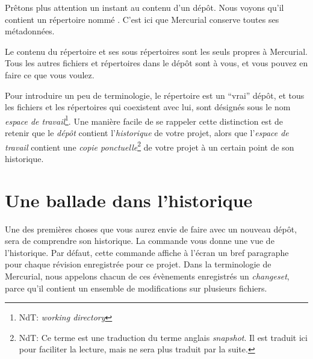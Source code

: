 Prêtons plus attention un instant au contenu d'un dépôt. Nous voyons 
qu'il contient un répertoire nommé . C'est ici que Mercurial
conserve toutes ses métadonnées.

Le contenu du répertoire  et ses sous répertoires sont les
seuls propres à Mercurial. Tous les autres fichiers et répertoires dans 
le dépôt sont à vous, et vous pouvez en faire ce que vous voulez.

Pour introduire un peu de terminologie, le répertoire  est
un ``vrai'' dépôt, et tous les fichiers et les répertoires qui coexistent
avec lui, sont désignés sous le nom \emph{espace de travail}\footnote{NdT: 
\textit{working directory}}. Une manière facile de se rappeler cette 
distinction est de retenir que le \emph{dépôt} contient l'\emph{historique}
de votre projet, alors que l'\emph{espace de travail} contient une \emph{copie
ponctuelle}\footnote{NdT: Ce terme est une traduction du terme anglais 
\textit{snapshot}. Il est traduit ici pour faciliter la lecture, mais ne sera
plus traduit par la suite.} de votre projet à un certain point de son
historique.

\section{Une ballade dans l'historique}

Une des premières choses que vous aurez envie de faire avec un nouveau
dépôt, sera de comprendre son historique. La commande  vous
donne une vue de l'historique.
Par défaut, cette commande affiche à l'écran un bref paragraphe pour chaque
révision enregistrée pour ce projet. Dans la terminologie de Mercurial, nous
appelons chacun de ces évènements enregistrés un \emph{changeset}, parce 
qu'il contient un ensemble de modifications sur plusieurs fichiers.

